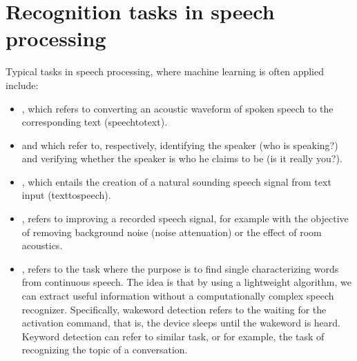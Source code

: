 \documentclass[letterpaper,10pt,english]{jupyterBook}
\begin{document}
\chapter{Recognition tasks in speech processing}
\label{\detokenize{Recognition_tasks_in_speech_processing:recognition-tasks-in-speech-processing}}\label{\detokenize{Recognition_tasks_in_speech_processing::doc}}
\sphinxAtStartPar
Typical tasks in speech processing, where machine learning is often
applied include:
\begin{itemize}
\item {} 
\sphinxAtStartPar
{}, which refers to converting an acoustic
waveform of spoken speech to the corresponding text
(speech\sphinxhyphen{}to\sphinxhyphen{}text).

\item {} 
\sphinxAtStartPar
{} and  which refer to,
respectively, identifying the speaker (who is speaking?) and
verifying whether the speaker is who he claims to be (is it really
you?).

\item {} 
\sphinxAtStartPar
{}, which entails the creation of a natural sounding
speech signal from text input (text\sphinxhyphen{}to\sphinxhyphen{}speech).

\item {} 
\sphinxAtStartPar
{}, refers to improving a
recorded speech signal, for example with the objective of removing
background noise (noise attenuation) or the effect of room
acoustics.

\item {} 
\sphinxAtStartPar
{\hyperref[\detokenize{Recognition/Wake-word_and_keyword_spotting::doc}]{}}, refers to the task
where the purpose is to find single characterizing words from
continuous speech. The idea is that by using a light\sphinxhyphen{}weight
algorithm, we can extract useful information without a
computationally complex speech recognizer. Specifically, wake\sphinxhyphen{}word
detection refers to the waiting for the activation command, that is,
the device sleeps until the wake\sphinxhyphen{}word is heard. Keyword detection
can refer to similar task, or for example, the task of recognizing
the topic of a conversation.


\end{itemize}
\end{document}
